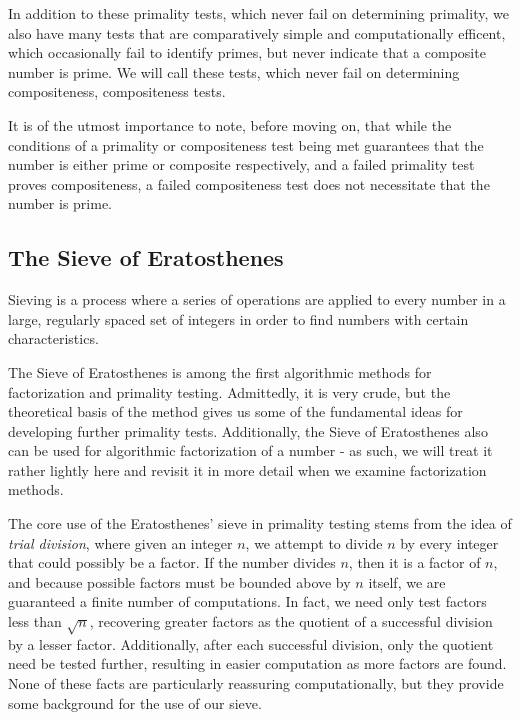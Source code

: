 \documentclass{article}
\begin{document}
\par In addition to these primality tests, which never fail on determining primality, we also have many tests that are comparatively simple and computationally efficent, which occasionally fail to identify primes, but never indicate that a composite number is prime. We will call these tests, which never fail on determining compositeness, compositeness tests.

\par It is of the utmost importance to note, before moving on, that while the conditions of a primality or compositeness test being met guarantees that the number is either prime or composite respectively, and a failed primality test proves compositeness, a failed compositeness test does not necessitate that the number is prime.

\subsection{ The Sieve of Eratosthenes }

\par Sieving is a process where a series of operations are applied to every number in a large, regularly spaced set of integers in order to find numbers with certain characteristics.

\par The Sieve of Eratosthenes is among the first algorithmic methods for factorization and primality testing. Admittedly, it is very crude, but the theoretical basis of the method gives us some of the fundamental ideas for developing further primality tests. Additionally, the Sieve of Eratosthenes also can be used for algorithmic factorization of a number - as such, we will treat it rather lightly here and revisit it in more detail when we examine factorization methods.

\par The core use of the Eratosthenes' sieve in primality testing stems from the idea of \textit{trial division}, where given an integer $n$, we attempt to divide $n$ by every integer that could possibly be a factor. If the number divides $n$, then it is a factor of $n$, and because possible factors must be bounded above by $n$ itself, we are guaranteed a finite number of computations. In fact, we need only test factors less than $\sqrt{n}$, recovering greater factors as the quotient of a successful division by a lesser factor. Additionally, after each successful division, only the quotient need be tested further, resulting in easier computation as more factors are found. None of these facts are particularly reassuring computationally, but they provide some background for the use of our sieve.
\end{document}
